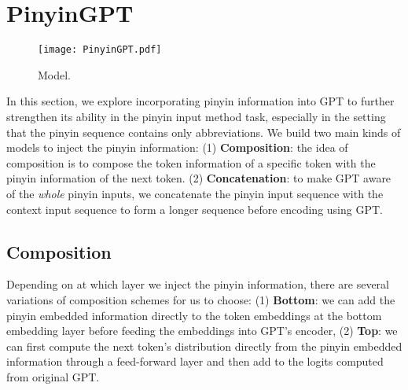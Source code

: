\section{PinyinGPT}

\begin{figure*}[ht]
\centering
\texttt{[image: PinyinGPT.pdf]}
\caption{Model.} 
\label{fig:pinyingpt}
\end{figure*}


In this section, we explore incorporating pinyin information into GPT to further strengthen its ability in the pinyin input method task, especially in the setting that the pinyin sequence contains only abbreviations.
We build two main kinds of models to inject the pinyin information:
(1) \textbf{Composition}: the idea of composition is to compose the token information of a specific token with the pinyin information of the next token.
(2) \textbf{Concatenation}: to make GPT aware of the \textit{whole} pinyin inputs, we concatenate the pinyin input sequence with the context input sequence to form a longer sequence before encoding using GPT.

\subsection{Composition} 

Depending on at which layer we inject the pinyin information, there are several variations of composition schemes for us to choose:
(1) \textbf{Bottom}: we can add the pinyin embedded information directly to the token embeddings at the bottom embedding layer before feeding the embeddings into GPT's encoder,
(2) \textbf{Top}: we can first compute the next token's distribution directly from the pinyin embedded information through a feed-forward layer and then add to the logits computed from original GPT.

